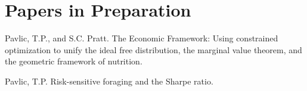 \section{Papers in Preparation}

\begin{bibenum}
    \item Pavlic, T.P., and S.C. Pratt. The Economic Framework: Using
        constrained optimization to unify the ideal free distribution,
        the marginal value theorem, and the geometric framework of
        nutrition.

    \item Pavlic, T.P. Risk-sensitive foraging and the Sharpe ratio.
\end{bibenum}
